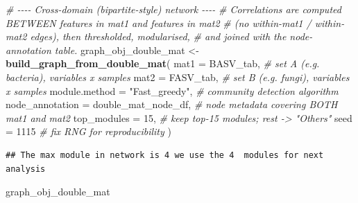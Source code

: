 \documentclass[
]{book}
\newenvironment{Shaded}{\begin{snugshade}}{\end{snugshade}}
\newcommand{\AttributeTok}[1]{\textcolor[rgb]{0.13,0.29,0.53}{#1}}
\newcommand{\CommentTok}[1]{\textcolor[rgb]{0.56,0.35,0.01}{\textit{#1}}}
\newcommand{\DecValTok}[1]{\textcolor[rgb]{0.00,0.00,0.81}{#1}}
\newcommand{\FunctionTok}[1]{\textcolor[rgb]{0.13,0.29,0.53}{\textbf{#1}}}
\newcommand{\NormalTok}[1]{#1}
\newcommand{\OtherTok}[1]{\textcolor[rgb]{0.56,0.35,0.01}{#1}}
\newcommand{\StringTok}[1]{\textcolor[rgb]{0.31,0.60,0.02}{#1}}
\begin{document}
\begin{Shaded}
\begin{Highlighting}[]
\CommentTok{\# {-}{-}{-}{-} Cross{-}domain (bipartite{-}style) network {-}{-}{-}{-}}
\CommentTok{\# Correlations are computed BETWEEN features in mat1 and features in mat2}
\CommentTok{\# (no within{-}mat1 / within{-}mat2 edges), then thresholded, modularised,}
\CommentTok{\# and joined with the node{-}annotation table.}
\NormalTok{graph\_obj\_double\_mat }\OtherTok{\textless{}{-}} \FunctionTok{build\_graph\_from\_double\_mat}\NormalTok{(}
  \AttributeTok{mat1            =}\NormalTok{ BASV\_tab,            }\CommentTok{\# set A (e.g. bacteria), variables x samples}
  \AttributeTok{mat2            =}\NormalTok{ FASV\_tab,            }\CommentTok{\# set B (e.g. fungi),    variables x samples}
  \AttributeTok{module.method   =} \StringTok{"Fast\_greedy"}\NormalTok{,       }\CommentTok{\# community detection algorithm}
  \AttributeTok{node\_annotation =}\NormalTok{ double\_mat\_node\_df,  }\CommentTok{\# node metadata covering BOTH mat1 and mat2}
  \AttributeTok{top\_modules     =} \DecValTok{15}\NormalTok{,                  }\CommentTok{\# keep top{-}15 modules; rest {-}\textgreater{} "Others"}
  \AttributeTok{seed            =} \DecValTok{1115}                 \CommentTok{\# fix RNG for reproducibility}
\NormalTok{)}
\end{Highlighting}
\end{Shaded}

\begin{verbatim}
## The max module in network is 4 we use the 4  modules for next analysis
\end{verbatim}

\begin{Shaded}
\begin{Highlighting}[]
\NormalTok{graph\_obj\_double\_mat}
\end{Highlighting}
\end{Shaded}
\end{document}

